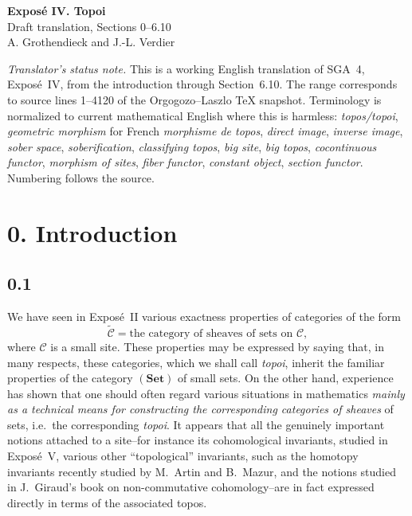 \documentclass[11pt]{article}
\newcommand{\C}{\mathcal{C}}
\newcommand{\Set}{\mathbf{Set}}
\newcommand{\ie}{i.e.}
\begin{document}
\begin{center}
{\Large \textbf{Expos\'e IV. Topoi}}\\[0.35em]
{\large Draft translation, Sections 0--6.10}\\[0.35em]
A. Grothendieck and J.-L. Verdier
\end{center}

\bigskip

\noindent\emph{Translator's status note.} This is a working English translation of SGA~4, Expos\'e~IV, from the introduction through Section~6.10. The range corresponds to source lines 1--4120 of the Orgogozo--Laszlo TeX snapshot. Terminology is normalized to current mathematical English where this is harmless: \emph{topos/topoi}, \emph{geometric morphism} for French \emph{morphisme de topos}, \emph{direct image}, \emph{inverse image}, \emph{sober space}, \emph{soberification}, \emph{classifying topos}, \emph{big site}, \emph{big topos}, \emph{cocontinuous functor}, \emph{morphism of sites}, \emph{fiber functor}, \emph{constant object}, \emph{section functor}. Numbering follows the source.

\section*{0. Introduction}

\subsection*{0.1}
We have seen in Expos\'e~II various exactness properties of categories of the form
\[
\widetilde{\C}=\text{the category of sheaves of sets on }\C,
\]
where \(\C\) is a small site. These properties may be expressed by saying that, in many respects, these categories, which we shall call \emph{topoi}, inherit the familiar properties of the category \((\Set)\) of small sets. On the other hand, experience has shown that one should often regard various situations in mathematics \emph{mainly as a technical means for constructing the corresponding categories of sheaves} of sets, \ie\ the corresponding \emph{topoi}. It appears that all the genuinely important notions attached to a site--for instance its cohomological invariants, studied in Expos\'e~V, various other ``topological'' invariants, such as the homotopy invariants recently studied by M.~Artin and B.~Mazur, and the notions studied in J.~Giraud's book on non-commutative cohomology--are in fact expressed directly in terms of the associated topos.
\end{document}
